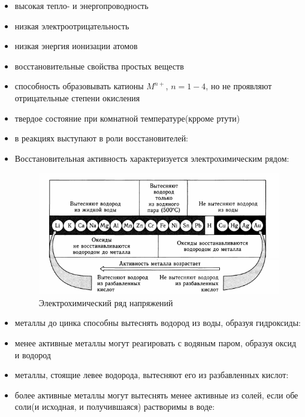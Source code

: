 \begin{itemize}
    \item высокая тепло- и энергопроводность
    \item низкая электроотрицательность
    \item низкая энергия ионизации атомов
    \item восстановительные свойства простых веществ
    \item способность образовывать катионы $M^{n+}$, $n = 1-4$, но не проявляют отрицательные степени окисления
    \item твердое состояние при комнатной температуре(крроме ртути)
    \item в реакциях выступают в роли восстановителей:
    
    
    
    \item Восстановительная активность характеризуется электрохимическим рядом:
    
    \begin{figure}[H]
        \centering
        \includegraphics[width = \textwidth]{TeX/Pictures/12_metalrow.png}
        \caption{Электрохимический ряд напряжений}
        \label{fig:12row_metal}
    \end{figure}
    
    \item металлы до цинка способны вытеснять водород из воды, образуя гидроксиды:
    
    
    \item менее активные металлы могут реагировать с водяным паром, образуя оксид и водород
    
    
    \item металлы, стоящие левее водорода, вытесняют его из разбавленных кислот:
    
    
    \item более активные металлы могут вытеснять менее активные из солей, если обе соли(и исходная, и получившаяся) растворимы в воде:
    
    
    
\end{itemize} 